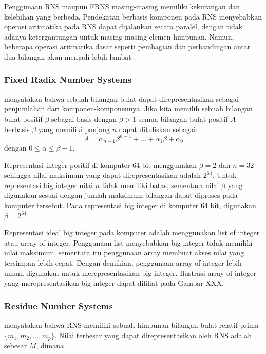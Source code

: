 Penggunaan RNS maupun FRNS masing-masing memiliki kekurangan dan kelebihan yang berbeda. Pendekatan berbasis komponen pada RNS menyebabkan operasi aritmatika pada RNS dapat dijalankan secara paralel, dengan tidak adanya ketergantungan untuk masing-masing elemen himpunan. Namun, beberapa operasi aritmatika dasar seperti pembagian dan perbandingan antar dua bilangan akan menjadi lebih lambat \citep{gpu_bignum}.

\subsubsection{Fixed Radix Number Systems} \label{frns}

\citet{modern_comp_math} menyatakan bahwa sebuah bilangan bulat dapat direpresentasikan sebagai penjumlahan dari komponen-komponennya. Jika kita memilih sebuah bilangan bulat positif $\beta$ sebagai basis dengan $\beta > 1 $ semua bilangan bulat positif $A$ berbasis $\beta$ yang memiliki panjang $n$ dapat dituliskan sebagai:
\begin{equation} \label{eq:frns_rep}
  A = \alpha_{n-1}\beta^{n-1}+...+\alpha_{1}\beta+\alpha_{0}
\end{equation}
dengan $0 \leq \alpha \leq \beta -1$.

Representasi integer positif di komputer 64 bit menggunakan $\beta = 2$ dan $n = 32$ sehingga nilai maksimum yang dapat direpresentasikan adalah $2^{64}$. Untuk representasi big integer nilai $n$ tidak memiliki batas, sementara nilai $\beta$ yang digunakan sesuai dengan jumlah maksimum bilangan dapat diproses pada komputer tersebut. Pada representasi big integer di komputer 64 bit, digunakan $\beta = 2^{64}$.

Representasi ideal big integer pada komputer adalah menggunakan list of integer atau array of integer. Penggunaan list menyebabkan big integer tidak memiliki nilai maksimum, sementara itu penggunaan array membuat akses nilai yang tersimpan lebih cepat. Dengan demikian, penggunaan array of integer lebih umum digunakan untuk merepresentasikan big integer. Ilustrasi array of integer yang merepresentasikan big integer dapat dilihat pada Gambar XXX.
\subsubsection{Residue Number Systems} \label{rns}
\citet{rns_survey} menyatakan bahwa RNS memiliki sebuah himpunan bilangan bulat relatif prima $\{m_1,m_2,...,m_p\}$. Nilai terbesar yang dapat direpresentasikan oleh RNS adalah sebesar $M$, dimana

